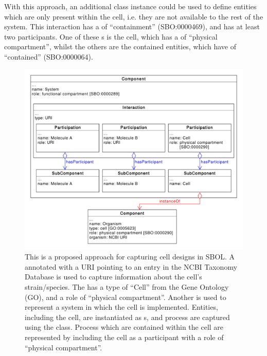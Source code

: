 With this approach, an additional  class instance could be used to define entities which are only present within the cell, i.e. they are not available to the rest of the system. 
This interaction has a  of ``containment'' (SBO:0000469), and has at least two participants. 
One of these s is the cell, which has a  of ``physical compartment'', whilst the others are the contained entities, which have  of ``contained''
(SBO:0000064).

\begin{figure}[ht]
	\begin{center}
		\includegraphics[width=\textwidth]{uml/cell_representation}
		\caption[Repressenting a cell]{This is a proposed approach for capturing cell designs in SBOL. A  annotated with a URI pointing to an entry in the NCBI Taxonomy Database is used to capture information about the cell's strain/species. 
		The  has a type of ``Cell'' from the Gene Ontology (GO), and a role of ``physical compartment''. 
		Another  is used to represent a system in which the cell is implemented. 
		Entities, including the cell, are instantiated as s, and process are captured using the  class.
		Process which are contained within the cell are represented by including the cell as a participant with a role of ``physical compartment''. }
		\label{uml:cell_representation}
	\end{center}
\end{figure}

